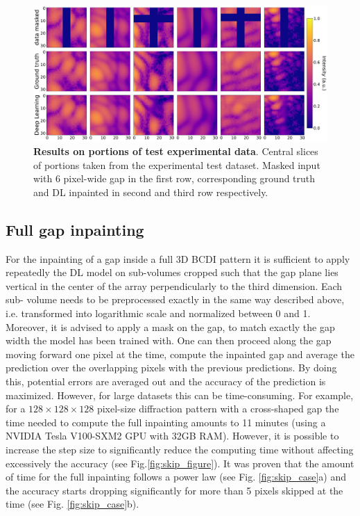 \begin{figure}[H]
    \centering
    \includegraphics[width=\textwidth]{figures/Inpainting/prediction_small_experiment.pdf}
    \caption{\textbf{Results on portions of test experimental data}. Central slices of portions taken from the experimental test
    dataset. Masked input with 6 pixel-wide gap in the first row, corresponding ground truth and DL inpainted in second and third
    row respectively.}
    \label{fig:pred_portions_exp}
\end{figure}

\subsection{Full gap inpainting}\label{sec:full_gap}

For the inpainting of a gap inside a full 3D BCDI pattern it is sufficient to apply repeatedly the DL model on sub-volumes 
cropped such that the gap plane lies vertical in the center of the array perpendicularly to the third dimension. Each sub-
volume needs to be preprocessed exactly in the same way described above, i.e. transformed into logarithmic scale and 
normalized between 0 and 1. Moreover, it is advised to apply a mask on the gap, to match exactly the gap width the model
has been trained with. 
One can then proceed along the gap moving forward one pixel at the time, compute the inpainted gap and average the prediction
over the overlapping pixels with the previous predictions. By doing this, potential errors are averaged out and the accuracy
of the prediction is maximized. However, for large datasets this can be time-consuming. For example, for a $128\times128\times128$ pixel-size
diffraction pattern with a cross-shaped gap the time needed to compute the full inpainting amounts to 11 minutes (using a 
NVIDIA Tesla V100-SXM2 GPU with 32GB RAM). However, it is possible to increase the step size to significantly reduce the computing
time without affecting excessively the accuracy (see Fig.\ref{fig:skip_figure}). It was proven that the amount of time for the full inpainting follows a power 
law (see Fig. \ref{fig:skip_case}a) and the accuracy starts dropping significantly for more than 5 pixels skipped at the time
(see Fig. \ref{fig:skip_case}b).  

